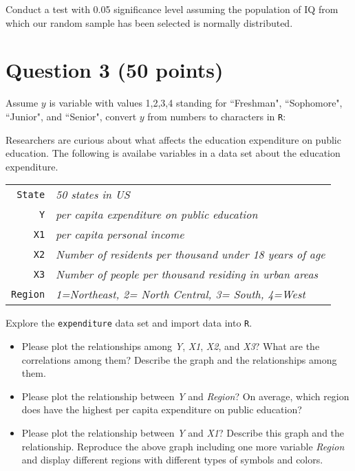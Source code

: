 \documentclass[12pt,letterpaper]{article}
\begin{document}
\noindent Conduct a test with 0.05 significance level assuming the population of IQ from which our random sample has been selected is normally distributed. 
 
\vspace{1cm}
	\section*{Question 3 (50 points)}
Assume $y$ is variable with values 1,2,3,4 standing for ``Freshman", ``Sophomore", ``Junior", and ``Senior", convert $y$ from numbers to characters in \texttt{R}:
\vspace{.5cm}
  
\vspace{.5cm}

\noindent Researchers are curious about what affects the education expenditure on public education. The following is availabe variables in a data set about the education expenditure. \\
\vspace{.5cm}


\begin{tabular}{r|l}
	\texttt{State} &\emph{50 states in US} \\
	\texttt{Y} & \emph{per capita expenditure on public education}\\
	\texttt{X1} &\emph{per capita personal income} \\
	\texttt{X2} &  \emph{Number of residents per thousand under 18 years of age}\\
	\texttt{X3} &  \emph{Number of people per thousand residing in urban areas} \\
	\texttt{Region} &  \emph{1=Northeast, 2= North Central, 3= South, 4=West} \\
\end{tabular}

\vspace{.5cm}
\noindent Explore the \texttt{expenditure} data set and import data into \texttt{R}.
\vspace{.5cm}
  
\vspace{.5cm}
\begin{itemize}

\item
Please plot the relationships among \emph{Y}, \emph{X1}, \emph{X2}, and \emph{X3}? What are the correlations among them? Describe the graph and the relationships among them.
\vspace{.5cm}
\item
Please plot the relationship between \emph{Y} and \emph{Region}? On average, which region does have the highest per capita expenditure on public education?
\vspace{.5cm}
\item
Please plot the relationship between \emph{Y} and \emph{X1}? Describe this graph and the relationship. Reproduce the above graph including one more variable \emph{Region} and display different regions with different types of symbols and colors.
\end{itemize}
\end{document}
